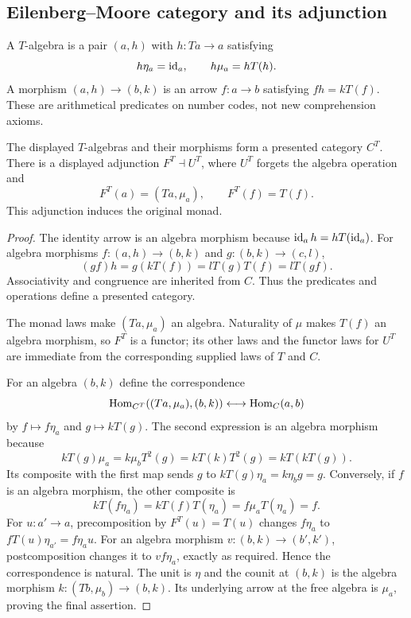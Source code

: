 \subsection{Eilenberg--Moore category and its adjunction}

A $T$-algebra is a pair $(a,h)$ with $h:Ta\to a$ satisfying
\[
 h\eta_a=\operatorname{id}_a,\qquad h\mu_a=hT(h).
\]
A morphism $(a,h)\to(b,k)$ is an arrow $f:a\to b$ satisfying
$f h=kT(f)$.  These are arithmetical predicates on number codes, not
new comprehension axioms.

\begin{theorem}\label{thm:em}
The displayed $T$-algebras and their morphisms form a presented category
$C^T$.  There is a displayed adjunction $F^T\dashv U^T$, where $U^T$ forgets
the algebra operation and
\[
 F^T(a)=(Ta,\mu_a),\qquad F^T(f)=T(f).
\]
This adjunction induces the original monad.
\end{theorem}
\begin{proof}
The identity arrow is an algebra morphism because $\operatorname{id}_a h=hT(\operatorname{id}_a)$.
For algebra morphisms $f:(a,h)\to(b,k)$ and $g:(b,k)\to(c,l)$,
\[
 (gf)h=g(kT(f))=lT(g)T(f)=lT(gf).
\]
Associativity and congruence are inherited from $C$.  Thus the predicates
and operations define a presented category.

The monad laws make $(Ta,\mu_a)$ an algebra.  Naturality of $\mu$ makes
$T(f)$ an algebra morphism, so $F^T$ is a functor; its other laws and the
functor laws for $U^T$ are immediate from the corresponding supplied laws of
$T$ and $C$.

For an algebra $(b,k)$ define the correspondence
\[
 \operatorname{Hom}_{C^T}((Ta,\mu_a),(b,k))\longleftrightarrow\operatorname{Hom}_C(a,b)
\]
by $f\mapsto f\eta_a$ and $g\mapsto kT(g)$.  The second expression is
an algebra morphism because
\[
 kT(g)\mu_a=k\mu_bT^2(g)
 =kT(k)T^2(g)=kT(kT(g)).
\]
Its composite with the first map sends $g$ to
$kT(g)\eta_a=k\eta_bg=g$.
Conversely, if $f$ is an algebra morphism, the other composite is
\[
 kT(f\eta_a)=kT(f)T(\eta_a)
 =f\mu_aT(\eta_a)=f.
\]
For $u:a'\to a$, precomposition by $F^T(u)=T(u)$ changes
$f\eta_a$ to $fT(u)\eta_{a'}=f\eta_a u$.
For an algebra morphism $v:(b,k)\to(b',k')$, postcomposition changes it to
$vf\eta_a$, exactly as required.  Hence the correspondence is natural.
The unit is $\eta$ and the counit at $(b,k)$ is the algebra morphism
$k:(Tb,\mu_b)\to(b,k)$.  Its underlying arrow at the free algebra is
$\mu_a$, proving the final assertion.
\end{proof}

